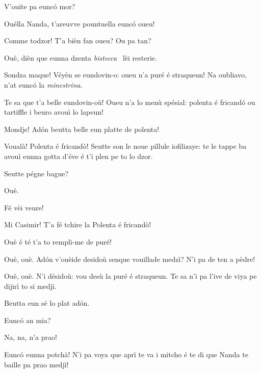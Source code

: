 \begin{drama}
\Fernandaspeaks V'ouite pa eunc\'o mor?

\Casimirspeaks Ouélla Nanda, t’areuvve pountuella eunc\'o oueu!

\Fernandaspeaks Comme todzor! T’a bièn fan oueu? Ou pa tan?

\Casimirspeaks Ouè, dièn que eunna dzenta \textit{bistecca} \bistecca\ lèi resterie.

\Gerominespeaks Sondza maque! Véyèn se eundovin-o: oueu n’a puré é straqueun! Na oubliavo, n’at eunc\'o la \textit{minestrina}.

\Fernandaspeaks Te sa que t’a belle eundovin-où! Oueu n'a lo menù spésial: polenta é fricand\'o ou tartiffle i beuro avouì lo lapeun!

\Casimirspeaks Mondje! Ad\'on beutta belle eun platte de polenta!


\Fernandaspeaks Voualà! Polenta é fricandò! Seutte son le noue pillule iofilizaye: te le tappe ba avouì eunna gotta d'éve é t'i plen pe to lo dzor.

\Casimirspeaks Seutte pégne bague?

\Fernandaspeaks  Ouè.

\Gerominespeaks{} Fé vèi veure!


\Fernandaspeaks Mi Casimir! T’a fé tchire la Polenta é fricandò! 

\Casimirspeaks Ouè é té t'a to rempli-me de puré!

\Fernandaspeaks {} Ouè, ouè. Ad\'on v'ouèide desidoù senque vouillade medzì? N'i pa de ten a pèdre!

\Casimirspeaks Ouè, ouè. N'i désidoù: vou desù la puré é straqueun. Te sa n’i pa l’ive de viya pe dijirì to si medjì.

\Fernandaspeaks Beutta eun sé lo plat ad\'on.


\Fernandaspeaks  Eunc\'o an mia?

\Casimirspeaks  Na, na, n'a prao!


\Fernandaspeaks Eunc\'o eunna potchà! N'i pa voya que aprì te va i mitcho é te di que Nanda te baille pa prao medjì!


\end{drama}
